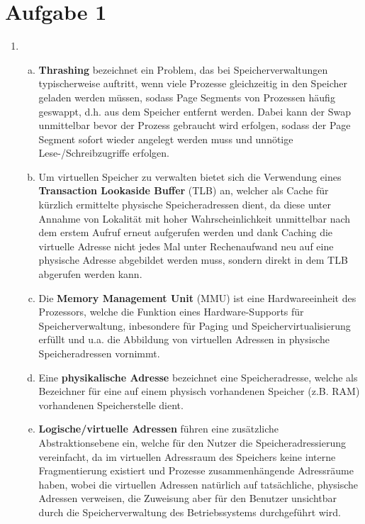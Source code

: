 \documentclass[numbers=noendperiod]{scrartcl}
\begin{document}
\section{Aufgabe 1}
\begin{enumerate}[1.]
	\item \begin{enumerate}[a)]
		\item \textbf{Thrashing} bezeichnet ein Problem, das bei Speicherverwaltungen typischerweise auftritt, wenn viele Prozesse gleichzeitig in den Speicher geladen werden müssen, sodass Page Segments von Prozessen häufig geswappt, d.h. aus dem Speicher entfernt werden. Dabei kann der Swap unmittelbar bevor der Prozess gebraucht wird erfolgen, sodass der Page Segment sofort wieder angelegt werden muss und unnötige Lese-/Schreibzugriffe erfolgen.
		
		\item Um virtuellen Speicher zu verwalten bietet sich die Verwendung eines \textbf{Transaction Lookaside Buffer} (TLB) an, welcher als Cache für kürzlich ermittelte physische Speicheradressen dient, da diese unter Annahme von Lokalität mit hoher Wahrscheinlichkeit unmittelbar nach dem erstem Aufruf erneut aufgerufen werden und dank Caching die virtuelle Adresse nicht jedes Mal unter Rechenaufwand neu auf eine physische Adresse abgebildet werden muss, sondern direkt in dem TLB abgerufen werden kann.
		
		\item Die \textbf{Memory Management Unit} (MMU) ist eine Hardwareeinheit des Prozessors, welche die Funktion eines Hardware-Supports für Speicherverwaltung, inbesondere für Paging und Speichervirtualisierung erfüllt und u.a. die Abbildung von virtuellen Adressen in physische Speicheradressen vornimmt.
		
		\item Eine \textbf{physikalische Adresse} bezeichnet eine Speicheradresse, welche als Bezeichner für eine auf einem physisch vorhandenen Speicher (z.B. RAM) vorhandenen Speicherstelle dient.
		
		\item \textbf{Logische/virtuelle Adressen} führen eine zusätzliche Abstraktionsebene ein, welche für den Nutzer die Speicheradressierung vereinfacht, da im virtuellen Adressraum des Speichers keine interne Fragmentierung existiert und Prozesse zusammenhängende Adressräume haben, wobei die virtuellen Adressen natürlich auf tatsächliche, physische Adressen verweisen, die Zuweisung aber für den Benutzer unsichtbar durch die Speicherverwaltung des Betriebssystems durchgeführt wird.
		

\end{enumerate}
\end{enumerate}
\end{document}
